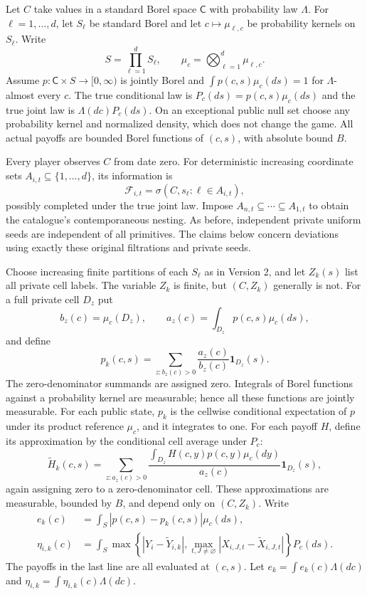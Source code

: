 \documentclass[11pt]{article}
\theoremstyle{remark}\newtheorem{remark}[theorem]{Remark}
\begin{document}
Let $C$ take values in a standard Borel space $\mathsf C$ with probability
law $\Lambda$. For $\ell=1,\ldots,d$, let $S_\ell$ be standard Borel
and let $c\mapsto\mu_{\ell,c}$ be probability kernels on $S_\ell$.
Write
\[
 S=\prod_{\ell=1}^d S_\ell,\qquad
 \mu_c=\bigotimes_{\ell=1}^d\mu_{\ell,c}.
\]
Assume $p:\mathsf C\times S\to[0,\infty)$ is jointly Borel and
$\int p(c,s)\mu_c(ds)=1$ for $\Lambda$-almost every $c$.
The true conditional law is $P_c(ds)=p(c,s)\mu_c(ds)$ and the true
joint law is $\Lambda(dc)P_c(ds)$. On an exceptional public null set
choose any probability kernel and normalized density, which does not
change the game. All actual payoffs are bounded Borel functions of
$(c,s)$, with absolute bound $B$.

Every player observes $C$ from date zero. For deterministic increasing
coordinate sets $A_{i,t}\subseteq\{1,\ldots,d\}$, its information is
\[
 \mathcal F_{i,t}=\sigma(C,s_\ell:\ell\in A_{i,t}),
\]
possibly completed under the true joint law. Impose
$A_{n,t}\subseteq\cdots\subseteq A_{1,t}$ to obtain the catalogue's
contemporaneous nesting. As before, independent private uniform seeds
are independent of all primitives. The claims below concern deviations
using exactly these original filtrations and private seeds.

Choose increasing finite partitions of each $S_\ell$ as in Version 2,
and let $Z_k(s)$ list all private cell labels. The variable $Z_k$ is
finite, but $(C,Z_k)$ generally is not. For a full private cell $D_z$
put
\[
 b_z(c)=\mu_c(D_z),\qquad
 a_z(c)=\int_{D_z}p(c,s)\mu_c(ds),
\]
and define
\begin{equation}\label{publicdensity}
 p_k(c,s)=\sum_{z:b_z(c)>0}\frac{a_z(c)}{b_z(c)}
                                      \mathbf1_{D_z}(s).
\end{equation}
The zero-denominator summands are assigned zero. Integrals of Borel
functions against a probability kernel are measurable; hence all these
functions are jointly measurable. For each public state, $p_k$ is the
cellwise conditional expectation of $p$ under its product reference
$\mu_c$, and it integrates to one.
For each payoff $H$, define its approximation by the conditional cell
average under $P_c$:
\[
 \widetilde H_k(c,s)=
 \sum_{z:a_z(c)>0}
  \frac{\int_{D_z}H(c,y)p(c,y)\mu_c(dy)}{a_z(c)}
                                      \mathbf1_{D_z}(s),
\]
again assigning zero to a zero-denominator cell. These approximations
are measurable, bounded by $B$, and depend only on $(C,Z_k)$.
Write
\begin{align*}
 e_k(c)&=\int_S|p(c,s)-p_k(c,s)|\mu_c(ds),\\
 \eta_{i,k}(c)&=
  \int_S\max\left\{|Y_i-\widetilde Y_{i,k}|,
       \max_{t,J\ne\varnothing}|X_{i,J,t}-\widetilde X_{i,J,t}|\right\}
                                                       P_c(ds).
\end{align*}
The payoffs in the last line are all evaluated at $(c,s)$.
Let $e_k=\int e_k(c)\Lambda(dc)$ and
$\eta_{i,k}=\int\eta_{i,k}(c)\Lambda(dc)$.
\end{document}
